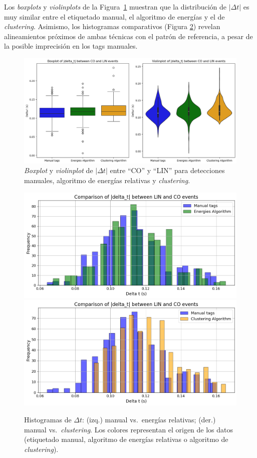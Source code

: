 Los \textit{boxplots} y \textit{violinplots} de la Figura~\ref{fig:dt_box_violin} 
muestran que la distribución de \(|\Delta t|\) es muy similar 
entre el etiquetado manual, el algoritmo de energías y el de 
\textit{clustering}. Asimismo, los histogramas comparativos 
(Figura \ref{fig:histograms_deltas}) revelan 
alineamientos próximos de ambas técnicas con el patrón de 
referencia, a pesar de la posible imprecisión en los tags 
manuales.  

\begin{figure}[ht]
  \centering
  \includegraphics[width=\linewidth]{Graphics/boxplot_and_violin.png}
  \caption{\textit{Boxplot} y \textit{violinplot} de \(|\Delta t|\) entre “CO” y “LIN” para detecciones manuales, algoritmo de energías relativas y \textit{clustering}.}
  \label{fig:dt_box_violin}
\end{figure}

\begin{figure}[ht]
  \centering
  \includegraphics[width=0.48\linewidth]{Graphics/histogram_energies_tags.png}
  \includegraphics[width=0.48\linewidth]{Graphics/histogram_clustering_tags.png}
  \caption{Histogramas de \(\Delta t\): (izq.) manual vs.\ energías relativas; (der.) manual vs.\ \textit{clustering}. Los colores representan el origen de los datos (etiquetado manual, algoritmo de energías relativas o algoritmo de \textit{clustering}).}
  \label{fig:histograms_deltas}
\end{figure}

